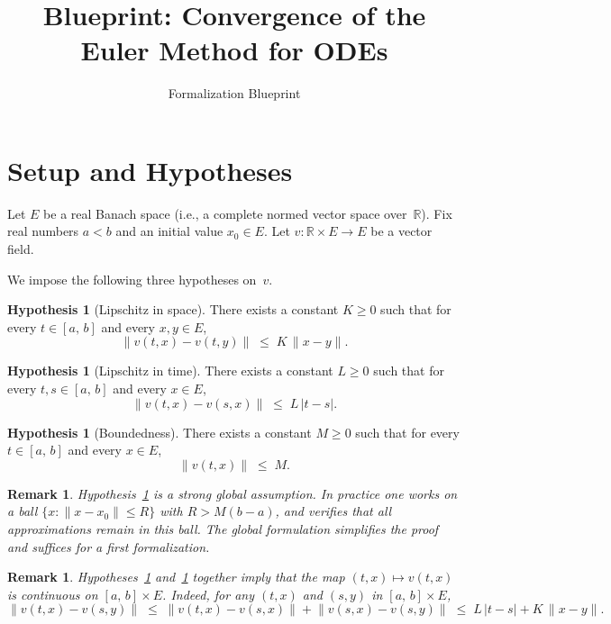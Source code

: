 \documentclass[11pt,a4paper]{article}
\title{Blueprint: Convergence of the Euler Method for ODEs}
\author{Formalization Blueprint}
\date{}
\newtheorem{remark}[theorem]{Remark}
\theoremstyle{definition}
\newtheorem{hypothesis}[theorem]{Hypothesis}
\newcommand{\norm}[1]{\lVert #1 \rVert}
\newcommand{\abs}[1]{\lvert #1 \rvert}
\newcommand{\R}{\mathbb{R}}
\newcommand{\Icc}[2]{[#1,\, #2]}
\begin{document}
\maketitle

\tableofcontents
\newpage

\section{Setup and Hypotheses}\label{sec:setup}

Let $E$ be a real Banach space (i.e., a complete normed vector space over~$\R$).
Fix real numbers $a < b$ and an initial value $x_0 \in E$.
Let $v \colon \R \times E \to E$ be a vector field.

We impose the following three hypotheses on~$v$.

\begin{hypothesis}[Lipschitz in space]\label{hyp:lip-x}
There exists a constant $K \ge 0$ such that for every $t \in \Icc{a}{b}$
and every $x, y \in E$,
\[
  \norm{v(t,x) - v(t,y)} \;\le\; K\,\norm{x - y}.
\]
\end{hypothesis}

\begin{hypothesis}[Lipschitz in time]\label{hyp:lip-t}
There exists a constant $L \ge 0$ such that for every $t, s \in \Icc{a}{b}$
and every $x \in E$,
\[
  \norm{v(t,x) - v(s,x)} \;\le\; L\,\abs{t - s}.
\]
\end{hypothesis}

\begin{hypothesis}[Boundedness]\label{hyp:bdd}
There exists a constant $M \ge 0$ such that for every $t \in \Icc{a}{b}$
and every $x \in E$,
\[
  \norm{v(t,x)} \;\le\; M.
\]
\end{hypothesis}

\begin{remark}
Hypothesis~\ref{hyp:bdd} is a strong global assumption.
In practice one works on a ball $\{x : \norm{x - x_0} \le R\}$
with $R > M(b-a)$, and verifies that all approximations remain
in this ball. The global formulation simplifies the proof and
suffices for a first formalization.
\end{remark}

\begin{remark}\label{rem:continuity}
Hypotheses~\ref{hyp:lip-x} and~\ref{hyp:lip-t} together imply
that the map $(t, x) \mapsto v(t, x)$ is continuous on
$\Icc{a}{b} \times E$. Indeed, for any $(t,x)$ and $(s,y)$
in $\Icc{a}{b} \times E$,
\[
  \norm{v(t,x) - v(s,y)}
  \;\le\; \norm{v(t,x) - v(s,x)} + \norm{v(s,x) - v(s,y)}
  \;\le\; L\,\abs{t - s} + K\,\norm{x - y}.
\]
\end{remark}
\end{document}
